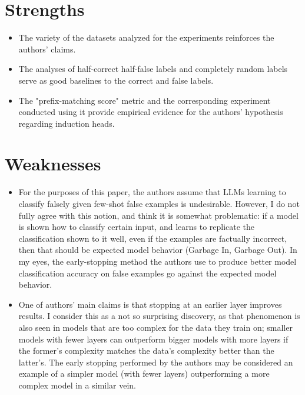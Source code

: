 \documentclass{IEEEtran}
\begin{document}
\section{Strengths}
\begin{itemize}
    \item The variety of the datasets analyzed for the experiments reinforces the authors' claims.
    \item The analyses of half-correct half-false labels and completely random labels serve as good baselines to the correct and false labels.
    \item The "prefix-matching score" metric and the corresponding experiment conducted using it provide empirical evidence for the authors' hypothesis regarding induction heads.
\end{itemize}

\section{Weaknesses}
\begin{itemize}
    \item For the purposes of this paper, the authors assume that LLMs learning to classify falsely given few-shot false examples is undesirable. However, I do not fully agree with this notion, and think it is somewhat problematic: if a model is shown how to classify certain input, and learns to replicate the classification shown to it well, even if the examples are factually incorrect, then that should be expected model behavior (Garbage In, Garbage Out). In my eyes, the early-stopping method the authors use to produce better model classification accuracy on false examples go against the expected model behavior.
    \item One of authors' main claims is that stopping at an earlier layer improves results. I consider this as a not so surprising discovery, as that phenomenon is also seen in models that are too complex for the data they train on; smaller models with fewer layers can outperform bigger models with more layers if the former's complexity matches the data's complexity better than the latter's. The early stopping performed by the authors may be considered an example of a simpler model (with fewer layers) outperforming a more complex model in a similar vein.
\end{itemize}
\end{document}
